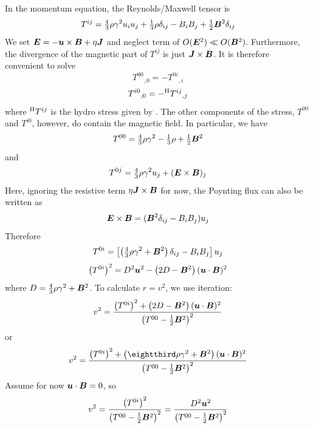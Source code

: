 \documentclass[twocolumn]{article}
\begin{document}
In the momentum equation, the Reynolds/Maxwell tensor is
\begin{equation}
T^{ij}={\textstyle{4\over3}}\rho\gamma^2 u_i u_j+{\textstyle{1\over3}}\rho\delta_{ij}-B_iB_j+{\textstyle{1\over2}}\bm{B}^2\delta_{ij}
\end{equation}
We set $\bm{E}=-\bm{u}\times\bm{B}+\eta\bm{J}$ and neglect term of
$O(\bm{E}^2)\ll O(\bm{B}^2)$.
Furthermore, the divergence of the magnetic part of $T^{ij}$ is just
$\bm{J}\times\bm{B}$.
It is therefore convenient to solve
\begin{equation}
{T^{00}}_{,0}=-{T^{0i}}_{,i}
\end{equation}
\begin{equation}
{T^{i0}}_{,0}=-^{\rm H}{T^{ij}}_{,j}
\end{equation}
where $^{\rm H}{T^{ij}}$ is the hydro stress given by .
The other components of the stress, ${T^{00}}$ and ${T^{i0}}$, however,
do contain the magnetic field.
In particular, we have
\begin{equation}
T^{00}={\textstyle{4\over3}}\rho\gamma^2-{\textstyle{1\over3}}\rho+{\textstyle{1\over2}}\bm{B}^2
\end{equation}
and
\begin{equation}
T^{0j}={\textstyle{4\over3}}\rho\gamma^2 u_j+(\bm{E}\times\bm{B})_j
\end{equation}
Here, ignoring the resistive term $\eta\bm{J}\times\bm{B}$ for now, the Poynting
flux can also be written as
\begin{equation}
\bm{E}\times\bm{B}=(\bm{B}^2\delta_{ij}-B_iB_j)u_j
\end{equation}
Therefore
\begin{equation}
T^{0i}=\left[\left({\textstyle{4\over3}}\rho\gamma^2+\bm{B}^2\right)\delta_{ij}-B_iB_j\right]u_j
\label{T0iTerm}
\end{equation}
\begin{equation}
\left(T^{0i}\right)^2=D^2\bm{u}^2-\left(2D-\bm{B}^2\right)(\bm{u}\cdot\bm{B})^2
\end{equation}
where $D={\textstyle{4\over3}}\rho\gamma^2+\bm{B}^2$.
To calculate $r=v^2$, we use iteration:
\begin{equation}
v^2=\frac{\left(T^{0i}\right)^2+\left(2D-\bm{B}^2\right)(\bm{u}\cdot\bm{B})^2}
{\left(T^{00}-{\textstyle{1\over2}}\bm{B}^2\right)^2}
\end{equation}
or
\begin{equation}
v^2=\frac{\left(T^{0i}\right)^2+\left(\eightthird\rho\gamma^2+\BB^2\right)(\uu\cdot\BB)^2}
{\left(T^{00}-\half\BB^2\right)^2}
\label{v2mag}
\end{equation}
Assume for now $\bm{u}\cdot\bm{B}=0$, so
\begin{equation}
v^2=\frac{\left(T^{0i}\right)^2}
{\left(T^{00}-{\textstyle{1\over2}}\bm{B}^2\right)^2}
=\frac{D^2\bm{u}^2}
{\left(T^{00}-{\textstyle{1\over2}}\bm{B}^2\right)^2}
\end{equation}
\end{document}
